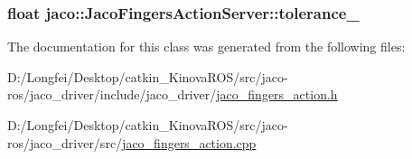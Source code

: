 \subsubsection[{\texorpdfstring{tolerance\+\_\+}{tolerance_}}]{\setlength{\rightskip}{0pt plus 5cm}float jaco\+::\+Jaco\+Fingers\+Action\+Server\+::tolerance\+\_\+\hspace{0.3cm}{\ttfamily [private]}}\hypertarget{classjaco_1_1JacoFingersActionServer_ad02d71429e1d137cb9fbd47cef703737}{}\label{classjaco_1_1JacoFingersActionServer_ad02d71429e1d137cb9fbd47cef703737}


The documentation for this class was generated from the following files\+:\begin{DoxyCompactItemize}
\item 
D\+:/\+Longfei/\+Desktop/catkin\+\_\+\+Kinova\+R\+O\+S/src/jaco-\/ros/jaco\+\_\+driver/include/jaco\+\_\+driver/\hyperlink{jaco__fingers__action_8h}{jaco\+\_\+fingers\+\_\+action.\+h}\item 
D\+:/\+Longfei/\+Desktop/catkin\+\_\+\+Kinova\+R\+O\+S/src/jaco-\/ros/jaco\+\_\+driver/src/\hyperlink{jaco__fingers__action_8cpp}{jaco\+\_\+fingers\+\_\+action.\+cpp}\end{DoxyCompactItemize}
